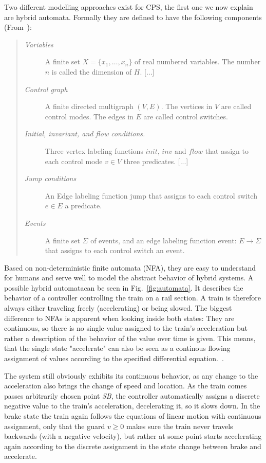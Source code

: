Two different modelling approaches exist for CPS, the first one we now explain are hybrid automata. Formally they are defined to have the following components (From~\cite{Heinzinger2000b}):
\begin{quote}
		\begin{description}
			\item[\textit{Variables}]A finite set \(X = \{x_1,\dots , x_n\}\) of real numbered variables. The number \(n\) is called the dimension of \(H\). [...]
			\item[\textit{Control graph}]A finite directed multigraph \((V, E)\). The vertices in \(V\) are called control modes. The edges in \(E\) are called control switches.
			\item[\textit{Initial, invariant, and flow conditions.}]Three vertex labeling functions \(init\), \(inv\) and \(flow\) that assign to each control mode \(v\in V\) three predicates. [...]
			\item[\textit{Jump conditions}]An Edge labeling function jump that assigns to each control switch  \(e \in E\) a predicate.
			\item[\textit{Events}]A finite set \(\Sigma\) of events, and an edge labeling function event: \(E \rightarrow \Sigma\) that assigns to each control switch an event.
		\end{description}
\end{quote} 

Based on non-deterministic finite automata (NFA), they are easy to understand for humans and serve well to model the abstract behavior of hybrid systems. A possible hybrid automatacan be seen in Fig.~\ref{fig:automata}. It describes the behavior of a controller controlling the train on a rail section. A train is therefore always either traveling freely (accelerating)  or being slowed. The biggest difference to NFAs is apparent when looking inside both states: They are continuous, so there is no single value assigned to the train's acceleration but rather a description of the behavior of the value over time is given. This means, that the single state "accelerate" can also be seen as a continous flowing assignment of values according to the specified differential equation.~\cite{platzerb2010}.

The system still obviously exhibits its continuous behavior, as any change to the acceleration also brings the change of speed and location. As the train comes passes arbitrarily chosen point \emph{SB}, the controller automatically assigns a discrete negative value to the train's acceleration, decelerating it, so it slows down. In the brake state the train again follows the equations of linear motion with continuous assignment, only that the guard \(v \geq 0\) makes sure the train never travels backwards (with a negative velocity), but rather at some point starts accelerating again according to the discrete assignment in the state change between brake and accelerate.

